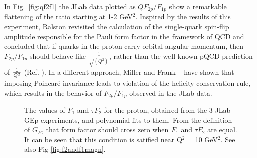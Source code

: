 In Fig.~\ref{fig:qf2f1} the JLab data plotted as
$QF_{2p}/F_{1p}$ show a remarkable flattening of the ratio starting at 1-2 GeV$^2$. 
Inspired by the results of this experiment, Ralston \cite{Ralston:2000,jain} revisited 
the calculation of the single-quark spin-flip 
amplitude responsible for the Pauli form factor in the framework of QCD and
concluded that if quarks in the proton carry orbital angular momentum, 
then  $F_{2p}/F_{1p}$ should behave like $\frac{1}{\sqrt{(Q^2)}}$, 
rather than the well known pQCD prediction of ${1}\over{Q^2}$ (Ref. \cite{brodsky}). 
In a different approach, Miller and Frank ~\cite{miller02} 
have shown that imposing Poincar\'{e} invariance leads to violation of the helicity 
conservation rule, which results in the behavior of $F_{2p}/F_{1p}$ observed in the JLab data.

\begin{figure}
\begin{center}
\caption{The values of $F_1$ and $\tau F_2$  for the proton, obtained from the 3 JLab GEp experiments, and polynomial fits to them. From the definition of $G_E$, 
that form factor should cross zero when $F_1$ and $\tau F_2$ are equal. It can  be seen that this condition is satified near Q$^2$ = 10 GeV$^2$. See also Fig 
\ref{fig:f2andf1magn}.}
\label{fig:f2andf1}
\end{center}
\end{figure}

